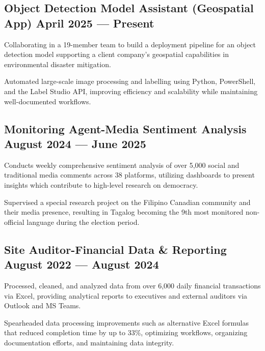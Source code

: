 \subsection{{Object Detection Model Assistant (Geospatial App) \hfill April 2025 --- Present}}
\begin{zitemize}
\item Collaborating in a 19-member team to build a deployment pipeline for an object detection model supporting a
client company’s geospatial capabilities in environmental disaster mitigation.
\item Automated large-scale image processing and labelling using Python, PowerShell, and the Label Studio API,
improving efficiency and scalability while maintaining well-documented workflows.
\end{zitemize}

\subsection{{Monitoring Agent-Media Sentiment Analysis \hfill August 2024 --- June 2025}}
\begin{zitemize}
\item Conducts weekly comprehensive sentiment analysis of over 5,000 social and traditional media comments across
38 platforms, utilizing dashboards to present insights which contribute to high-level research on democracy.
\item Supervised a special research project on the Filipino Canadian community and their media presence, resulting
in Tagalog becoming the 9th most monitored non-official language during the election period.
\end{zitemize}

\subsection{{Site Auditor-Financial Data \& Reporting \hfill August 2022 --- August 2024}}
\begin{zitemize}
\item Processed, cleaned, and analyzed data from over 6,000 daily financial transactions via Excel, providing analytical
reports to executives and external auditors via Outlook and MS Teams.
\item Spearheaded data processing improvements such as alternative Excel formulas that reduced completion time by
up to 33\%, optimizing workflows, organizing documentation efforts, and maintaining data integrity.
\end{zitemize}

